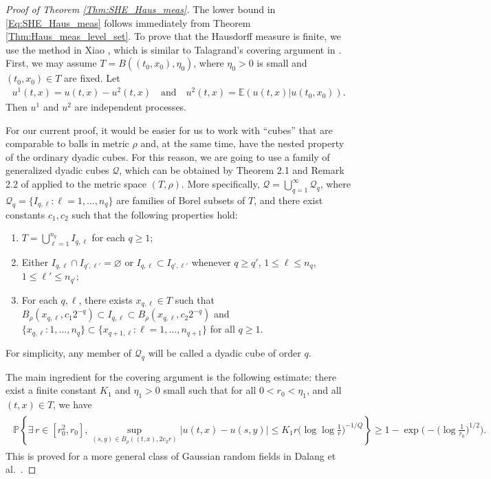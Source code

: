 \documentclass[11pt, reqno]{amsart}
\def\E{{\mathbb E}}
\def\P{{\mathbb P}}
\numberwithin{equation}{section}
\begin{document}
\begin{proof}[Proof of Theorem \ref{Thm:SHE_Haus_meas}]
The lower bound in \eqref{Eq:SHE_Haus_meas} follows immediately from Theorem \ref{Thm:Haus_meas_level_set}.
To prove that the Hausdorff measure is finite, we use the method in Xiao \cite{X97}, which is similar to 
Talagrand's covering argument in \cite{T98}. 
First, we may assume $T = B((t_0, x_0), \eta_0)$, where $\eta_0 > 0$ is small and $(t_0, x_0) \in T$ are fixed. Let
\begin{align*}
u^1(t, x) = u(t, x) - u^2(t, x) \quad \text{and} \quad
u^2(t, x) = \E(u(t, x) | u(t_0, x_0)).
\end{align*}
Then $u^1$ and $u^2$ are independent processes.

For our current proof, it would be easier for us to work with ``cubes'' that are comparable to balls in metric $\rho$ and, 
at the same time, have the nested property of the ordinary dyadic cubes.
For this reason, we are going to use a family of generalized dyadic cubes $\mathscr{Q}$, which can be obtained by 
Theorem 2.1 and Remark 2.2 of \cite{KRS12} applied to the metric space $(T, \rho)$.
More specifically, $\mathscr{Q} = \bigcup_{q=1}^\infty \mathscr{Q}_q$, where $\mathscr{Q}_q = \{ I_{q, \ell} : 
\ell =1, \dots, n_q \}$ are families of Borel subsets of $T$, and there exist constants $c_1, c_2$ such that the 
following properties hold:
\begin{enumerate}
\item[(i)] $T = \bigcup_{\ell=1}^{n_q} I_{q, \ell}$ for each $q \ge 1$;
\item[(ii)] Either $I_{q, \ell} \cap I_{q', \ell'} = \varnothing$ or $I_{q, \ell}
\subset I_{q', \ell'}$ whenever $q \ge q'$, $1 \le \ell \le n_q$, $1 \le \ell' \le n_{q'}$;
\item[(iii)] For each $q, \ell$, there exists $x_{q, \ell} \in T$ such that
$ B_\rho(x_{q,\ell}, c_1 2^{-q}) \subset I_{q,\ell} \subset B_\rho(x_{q,\ell}, c_2 2^{-q})$
and $\{ x_{q,\ell} : 1, \dots, n_q \} \subset \{x_{q+1, \ell} : \ell = 1, \dots, n_{q+1} \}$ for
all $q \ge 1$.
\end{enumerate}
For simplicity, any member of $\mathscr{Q}_q$ will be called a dyadic cube of order $q$.

The main ingredient for the covering argument is the following estimate: 
there exist a finite constant $K_1$ and $\eta_1 > 0$ small such that for all $0 < r_0 < \eta_1$, and all $(t, x) \in T$, we have
\begin{align}
\begin{aligned}\label{Eq:SHE_main_est}
\P\left\{ \exists\, r \in [r_0^2, r_0], \sup_{(s, y) \in B_\rho((t, x), 2c_2r)} |u(t, x) - u(s, y)| \le K_1 r\Big( \log\log \frac{1}{r}\Big)^{-1/Q} \right\}
\ge 1 - \exp\bigg(-\Big(\log\frac{1}{r_0}\Big)^{1/2} \bigg).
\end{aligned}
\end{align}
This is proved for a more general class of Gaussian random fields in Dalang et al.~\cite{DMX17}.


\end{proof}
\end{document}
